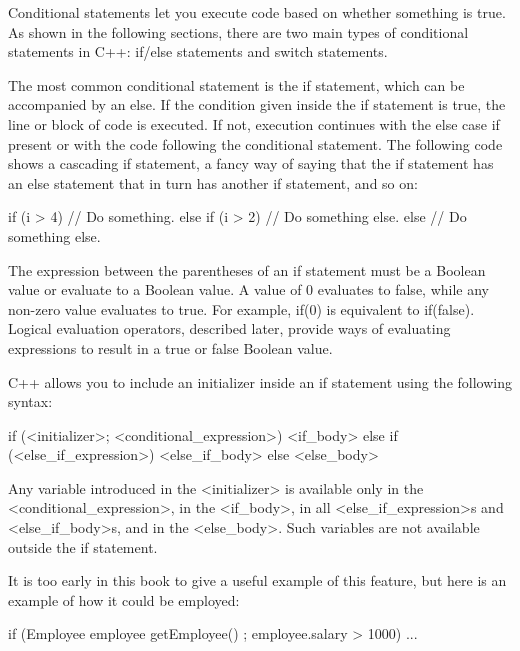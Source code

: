 
Conditional statements let you execute code based on whether something is true. As shown in the following sections, there are two main types of conditional statements in C++: if/else statements and switch statements.


The most common conditional statement is the if statement, which can be accompanied by an else. If the condition given inside the if statement is true, the line or block of code is executed. If not, execution continues with the else case if present or with the code following the conditional statement. The following code shows a cascading if statement, a fancy way of saying that the if statement has an else statement that in turn has another if statement, and so on:

\begin{cpp}
if (i > 4) {
    // Do something.
} else if (i > 2) {
    // Do something else.
} else {
    // Do something else.
}
\end{cpp}

The expression between the parentheses of an if statement must be a Boolean value or evaluate to a Boolean value. A value of 0 evaluates to false, while any non-zero value evaluates to true. For example, if(0) is equivalent to if(false). Logical evaluation operators, described later, provide ways of evaluating expressions to result in a true or false Boolean value.


C++ allows you to include an initializer inside an if statement using the following syntax:

\begin{cpp}
if (<initializer>; <conditional_expression>) {
    <if_body>
} else if (<else_if_expression>) {
    <else_if_body>
} else {
    <else_body>
}
\end{cpp}

Any variable introduced in the <initializer> is available only in the <conditional\_expression>, in the <if\_body>, in all <else\_if\_expression>s and <else\_if\_body>s, and in the <else\_body>. Such variables are not available outside the if statement.

It is too early in this book to give a useful example of this feature, but here is an example of how it could be employed:

\begin{cpp}
if (Employee employee { getEmployee() }; employee.salary > 1000) { ... }
\end{cpp}


